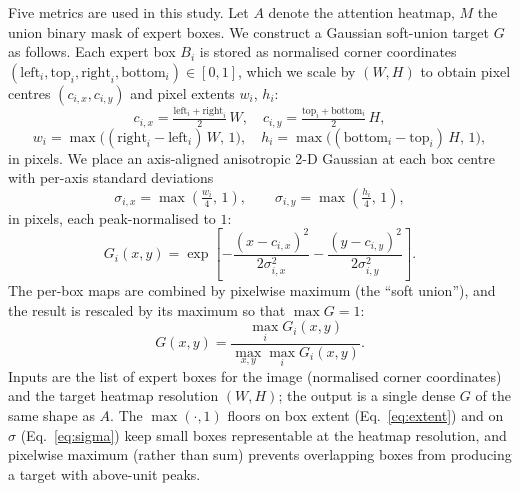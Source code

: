 \documentclass[lineno,pdflatex,sn-mathphys-num]{sn-jnl}%
\theoremstyle{thmstyleone}%
\theoremstyle{thmstyletwo}%
\theoremstyle{thmstylethree}%
\begin{document}
Five metrics are used in this study. Let $A$ denote the attention heatmap, $M$ the union binary mask of expert boxes. We construct a Gaussian soft-union
target $G$ as follows. Each expert box $B_i$ is stored as normalised
corner coordinates $(\mathrm{left}_i, \mathrm{top}_i, \mathrm{right}_i,
\mathrm{bottom}_i) \in [0, 1]$, which we scale by $(W, H)$ to obtain
pixel centres $(c_{i,x}, c_{i,y})$ and pixel extents $w_i$, $h_i$:
\begin{equation}
c_{i,x} = \tfrac{\mathrm{left}_i + \mathrm{right}_i}{2}\,W,
\quad
c_{i,y} = \tfrac{\mathrm{top}_i + \mathrm{bottom}_i}{2}\,H,
\label{eq:centre}
\end{equation}
\begin{equation}
w_i = \max\!\big((\mathrm{right}_i - \mathrm{left}_i)\,W,\, 1\big),
\quad
h_i = \max\!\big((\mathrm{bottom}_i - \mathrm{top}_i)\,H,\, 1\big),
\label{eq:extent}
\end{equation}
in pixels. We place an axis-aligned anisotropic 2-D Gaussian at each
box centre with per-axis standard deviations
\begin{equation}
\sigma_{i,x} = \max\!\left(\tfrac{w_i}{4},\, 1\right),
\qquad
\sigma_{i,y} = \max\!\left(\tfrac{h_i}{4},\, 1\right),
\label{eq:sigma}
\end{equation}
in pixels, each peak-normalised to $1$:
\begin{equation}
G_i(x, y) = \exp\!\left[
-\frac{(x - c_{i,x})^{2}}{2\sigma_{i,x}^{2}}
-\frac{(y - c_{i,y})^{2}}{2\sigma_{i,y}^{2}}
\right].
\label{eq:gauss_per_box}
\end{equation}
The per-box maps are combined by pixelwise maximum (the ``soft
union''), and the result is rescaled by its maximum so that
$\max G = 1$:
\begin{equation}
G(x, y) = \frac{\max_{i} G_i(x, y)}{\max_{x, y} \max_{i} G_i(x, y)}.
\label{eq:gauss_union}
\end{equation}
Inputs are the list of expert boxes for the image (normalised corner
coordinates) and the target heatmap resolution $(W, H)$; the output is
a single dense $G$ of the same shape as $A$. The $\max(\cdot, 1)$
floors on box extent (Eq.~\ref{eq:extent}) and on $\sigma$
(Eq.~\ref{eq:sigma}) keep small boxes representable at the heatmap
resolution, and pixelwise maximum (rather than sum) prevents
overlapping boxes from producing a target with above-unit peaks.
\end{document}
